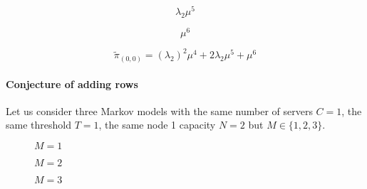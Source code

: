 \begin{multicols}{4}
    \begin{figure}[H]
        \centering
        \scalebox{0.48}{
            }
    \end{figure}
    \vspace*{\fill}
    \columnbreak
    \begin{equation*}
        \lambda_2 \mu^5
    \end{equation*}
    \vspace*{\fill}
    \columnbreak
    \begin{figure}[H]
        \centering
        \scalebox{0.48}{
            }
    \end{figure}
    \vspace*{\fill}
    \columnbreak
    \begin{equation*}
        \mu^6
    \end{equation*}
\end{multicols}


\begin{equation*}
    \tilde{\pi}_{(0,0)} = (\lambda_2)^2 \mu^4 + 2 \lambda_2 \mu^5 + \mu^6
\end{equation*}

\paragraph{Conjecture of adding rows}

Let us consider three Markov models with the same number of servers \(C=1\),
the same threshold \(T=1\), the same node 1 capacity \(N=2\) but
\(M\in\{1, 2, 3\}\).


\begin{multicols}{3}
    \begin{figure}[H]
        \centering
        \scalebox{0.65}{
            }
        \caption{\(M=1\)}
    \end{figure}
    \columnbreak
    \begin{figure}[H]
        \centering
        \scalebox{0.65}{
            }
        \caption{\(M=2\)}
    \end{figure}
    \begin{figure}[H]
        \centering
        \scalebox{0.65}{
            }
        \caption{\(M=3\)}
    \end{figure}
\end{multicols}

